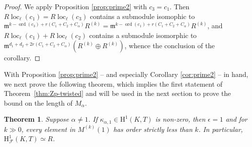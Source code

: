 \documentclass[10pt]{amsart}
\numberwithin{equation}{section}
\newtheorem{theorem}{Theorem}
\theoremstyle{definition}
\theoremstyle{remark}
\newcommand{\rH}{\mathrm{H}}
\newcommand{\fm}{\mathfrak{m}}
\DeclareMathOperator{\loc}{loc}
\DeclareMathOperator{\ord}{ord}
\newcommand{\CF}{\mathcal{F}}
\newcommand{\kap}{\kappa}
\begin{document}
\begin{proof} We apply Proposition \ref{prop:prime2}
with $c_3 = c_1$. Then $R\loc_\ell(c_1) = R\loc_\ell(c_3)$ contains a submodule isomophic 
to $\fm^{k-\ord(c_3)+r(C_1+C_2+C_\alpha)}R^{(k)} = \fm^{k-\ord(c_1)+r(C_1+C_2+C_\alpha)}R^{(k)}$, and
$R\loc_\ell(c_1) + R\loc_\ell(c_2)$ contains a submodule isomorphic to 
$\fm^{d_1+d_2+2r(C_1+C_2+C_\alpha)}(R^{(k)}\oplus R^{(k)})$,
whence the conclusion of the corollary.
\end{proof}


With Proposition \ref{prop:prime2} -- and especially Corollary \ref{cor:prime2} -- in hand, we next prove the following theorem, which implies the first statement of Theorem~\ref{thm:Zp-twisted} and will be used in the next section to prove the bound on
the length of $M_\alpha$.

\begin{theorem}\label{thm:rank1}
Suppose $\alpha\neq 1$. 
If $\kap_{\alpha,1}\in \rH^1(K,T)$ is non-zero, then $\epsilon=1$ and for $k\gg 0$, every element in $M^{(k)}(1)$ has order strictly less than $k$. In particular, $\rH^1_{\CF}(K,T)\simeq R$.
\end{theorem} 
\end{document}
